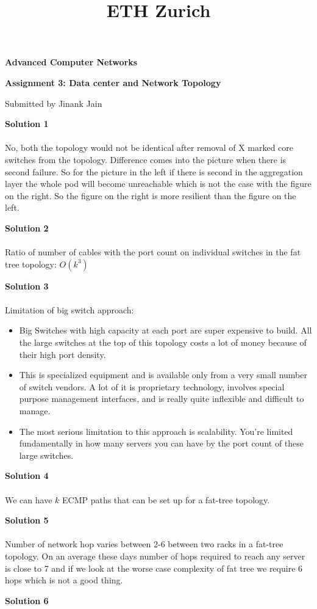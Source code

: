 \documentclass[letterpaper, 11pt]{article}
\title{ETH Zurich}
\begin{document}

\begin{center}
\Large \bf Advanced Computer Networks

\Large \bf Assignment 3: Data center and Network Topology

\large Submitted by Jinank Jain
\end{center}

\textbf{Solution 1}\\ \\
No, both the topology would not be identical after removal of X marked core switches from the topology. Difference comes into the picture when there is second failure. So for the picture in the left if there is second in the aggregation layer the whole pod will become unreachable which is not the case with the figure on the right. So the figure on the right is more resilient than the figure on the left.
\bigskip

\textbf{Solution 2}\\ \\
Ratio of number of cables with the port count on individual switches in the fat tree topology: $O(k^3)$ 
\bigskip

\textbf{Solution 3}\\ \\
Limitation of big switch approach: 
\begin{itemize}
	\item Big Switches with high capacity at each port are super expensive to build.  All the large switches at the top of this topology costs a lot of money because of their high port density. 
	\item This is specialized equipment and is available only from a very small number of switch vendors. A lot of it is proprietary technology, involves special purpose management interfaces, and is really quite inflexible and difficult to manage.
	\item The most serious limitation to this approach is scalability. You're limited fundamentally in how many servers you can have by the port count of these large switches.
\end{itemize}
\bigskip

\textbf{Solution 4}\\ \\
We can have $k$ ECMP paths that can be set up for a fat-tree topology.
\bigskip


\textbf{Solution 5}\\ \\
Number of network hop varies between 2-6 between two racks in a fat-tree topology. On an average these days number of hops required to reach any server is close to 7 and if we look at the worse case complexity of fat tree we require 6 hops which is not a good thing.
\bigskip

\textbf{Solution 6}\\ \\

\bigskip

\clearpage

\end{document}
